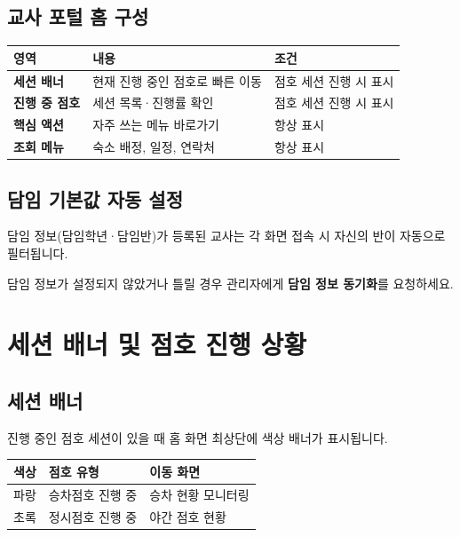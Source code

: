 \documentclass[a4paper,11pt]{article}
\begin{document}
\subsection{교사 포털 홈 구성}

\begin{center}
\begin{tabular}{@{}lll@{}}
  \toprule
  \textbf{영역} & \textbf{내용} & \textbf{조건} \\
  \midrule
  \textbf{세션 배너} & 현재 진행 중인 점호로 빠른 이동 & 점호 세션 진행 시 표시 \\
  \textbf{진행 중 점호} & 세션 목록·진행률 확인 & 점호 세션 진행 시 표시 \\
  \textbf{핵심 액션} & 자주 쓰는 메뉴 바로가기 & 항상 표시 \\
  \textbf{조회 메뉴} & 숙소 배정, 일정, 연락처 & 항상 표시 \\
  \bottomrule
\end{tabular}
\end{center}

\subsection{담임 기본값 자동 설정}

담임 정보(담임학년·담임반)가 등록된 교사는 각 화면 접속 시 자신의 반이 자동으로 필터됩니다.

\begin{tcolorbox}[infobox]
담임 정보가 설정되지 않았거나 틀릴 경우 관리자에게 \textbf{담임 정보 동기화}를 요청하세요.
\end{tcolorbox}

\section{세션 배너 및 점호 진행 상황}

\subsection{세션 배너}

진행 중인 점호 세션이 있을 때 홈 화면 최상단에 색상 배너가 표시됩니다.

\begin{center}
\begin{tabular}{@{}cll@{}}
  \toprule
  \textbf{색상} & \textbf{점호 유형} & \textbf{이동 화면} \\
  \midrule
  파랑 & 승차점호 진행 중 & 승차 현황 모니터링 \\
  초록 & 정시점호 진행 중 & 야간 점호 현황 \\
  \bottomrule
\end{tabular}
\end{center}
\end{document}
